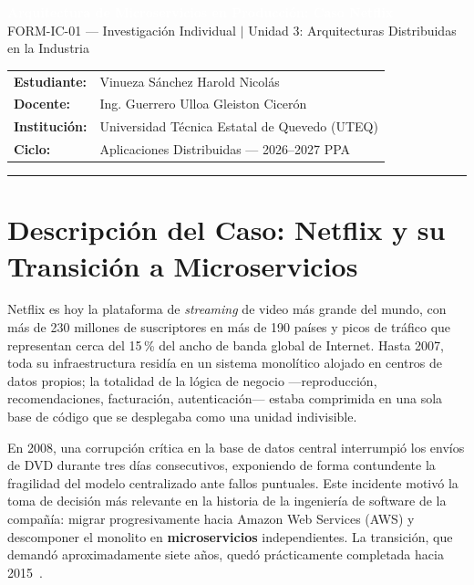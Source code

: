 \documentclass[11pt,a4paper]{article}
\begin{document}

\noindent
\colorbox{uteqblue}{\parbox{\dimexpr\linewidth-2\fboxsep}{%
  \vspace{6pt}
  \centering
  \textcolor{white}{\large\bfseries
    Arquitectura de Microservicios en Producci\'on: Caso Netflix}\\[3pt]
  \textcolor{white!80!uteqblue}{\small
    FORM-IC-01 --- Investigaci\'on Individual $|$ Unidad 3: Arquitecturas Distribuidas en la Industria}
  \vspace{6pt}
}}

\vspace{6pt}
\noindent
\begin{tabular}{@{}ll}
  \textbf{Estudiante:}  & Vinueza S\'anchez Harold Nicol\'as \\
  \textbf{Docente:}     & Ing. Guerrero Ulloa Gleiston Cicer\'on \\
  \textbf{Instituci\'on:} & Universidad T\'ecnica Estatal de Quevedo (UTEQ) \\
  \textbf{Ciclo:}       & Aplicaciones Distribuidas --- 2026--2027 PPA \\
\end{tabular}
\vspace{4pt}
\rule{\linewidth}{0.4pt}

\section{Descripci\'on del Caso: Netflix y su Transici\'on a Microservicios}

Netflix es hoy la plataforma de \textit{streaming} de video m\'as grande del mundo, con m\'as
de 230 millones de suscriptores en m\'as de 190 pa\'ises y picos de tr\'afico que representan
cerca del 15\,\% del ancho de banda global de Internet. Hasta 2007, toda su infraestructura
resid\'ia en un sistema monol\'itico alojado en centros de datos propios; la totalidad de la
l\'ogica de negocio ---reproducci\'on, recomendaciones, facturaci\'on, autenticaci\'on--- estaba
comprimida en una sola base de c\'odigo que se desplegaba como una unidad indivisible.

En 2008, una corrupci\'on cr\'itica en la base de datos central interrumpi\'o los env\'ios de DVD
durante tres d\'ias consecutivos, exponiendo de forma contundente la fragilidad del modelo
centralizado ante fallos puntuales. Este incidente motiv\'o la toma de decisi\'on m\'as relevante
en la historia de la ingenier\'ia de software de la compa\~n\'ia: migrar progresivamente hacia
Amazon Web Services (AWS) y descomponer el monolito en \textbf{microservicios}
independientes. La transici\'on, que demand\'o aproximadamente siete a\~nos, qued\'o pr\'acticamente
completada hacia 2015~\cite{balalaie2016}.
\end{document}

